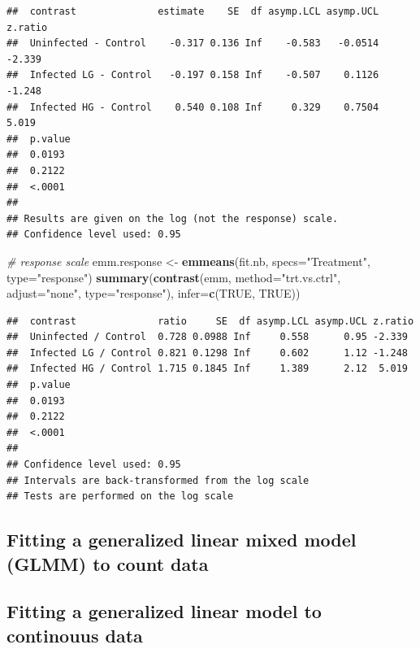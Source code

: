\documentclass[]{book}
\newenvironment{Shaded}{\begin{snugshade}}{\end{snugshade}}
\newcommand{\CommentTok}[1]{\textcolor[rgb]{0.56,0.35,0.01}{\textit{#1}}}
\newcommand{\DataTypeTok}[1]{\textcolor[rgb]{0.13,0.29,0.53}{#1}}
\newcommand{\KeywordTok}[1]{\textcolor[rgb]{0.13,0.29,0.53}{\textbf{#1}}}
\newcommand{\NormalTok}[1]{#1}
\newcommand{\OtherTok}[1]{\textcolor[rgb]{0.56,0.35,0.01}{#1}}
\newcommand{\StringTok}[1]{\textcolor[rgb]{0.31,0.60,0.02}{#1}}
\begin{document}
\begin{verbatim}
##  contrast              estimate    SE  df asymp.LCL asymp.UCL z.ratio
##  Uninfected - Control    -0.317 0.136 Inf    -0.583   -0.0514 -2.339 
##  Infected LG - Control   -0.197 0.158 Inf    -0.507    0.1126 -1.248 
##  Infected HG - Control    0.540 0.108 Inf     0.329    0.7504  5.019 
##  p.value
##  0.0193 
##  0.2122 
##  <.0001 
## 
## Results are given on the log (not the response) scale. 
## Confidence level used: 0.95
\end{verbatim}

\begin{Shaded}
\begin{Highlighting}[]
\CommentTok{# response scale}
\NormalTok{emm.response <-}\StringTok{ }\KeywordTok{emmeans}\NormalTok{(fit.nb, }\DataTypeTok{specs=}\StringTok{"Treatment"}\NormalTok{, }\DataTypeTok{type=}\StringTok{"response"}\NormalTok{)}
\KeywordTok{summary}\NormalTok{(}\KeywordTok{contrast}\NormalTok{(emm, }\DataTypeTok{method=}\StringTok{"trt.vs.ctrl"}\NormalTok{, }\DataTypeTok{adjust=}\StringTok{"none"}\NormalTok{, }\DataTypeTok{type=}\StringTok{"response"}\NormalTok{), }\DataTypeTok{infer=}\KeywordTok{c}\NormalTok{(}\OtherTok{TRUE}\NormalTok{, }\OtherTok{TRUE}\NormalTok{))}
\end{Highlighting}
\end{Shaded}

\begin{verbatim}
##  contrast              ratio     SE  df asymp.LCL asymp.UCL z.ratio
##  Uninfected / Control  0.728 0.0988 Inf     0.558      0.95 -2.339 
##  Infected LG / Control 0.821 0.1298 Inf     0.602      1.12 -1.248 
##  Infected HG / Control 1.715 0.1845 Inf     1.389      2.12  5.019 
##  p.value
##  0.0193 
##  0.2122 
##  <.0001 
## 
## Confidence level used: 0.95 
## Intervals are back-transformed from the log scale 
## Tests are performed on the log scale
\end{verbatim}

\hypertarget{fitting-a-generalized-linear-mixed-model-glmm-to-count-data}{%
\subsection{Fitting a generalized linear mixed model (GLMM) to count data}\label{fitting-a-generalized-linear-mixed-model-glmm-to-count-data}}

\hypertarget{fitting-a-generalized-linear-model-to-continouus-data}{%
\subsection{Fitting a generalized linear model to continouus data}\label{fitting-a-generalized-linear-model-to-continouus-data}}
\end{document}
